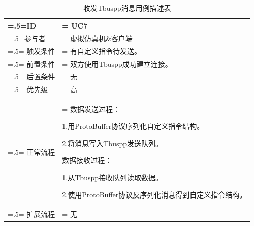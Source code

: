 \begin{table}[htbp]
    \begin{center}
        \caption{收发Tbuspp消息用例描述表}
        \label{usecase7}
        \renewcommand\arraystretch{1.5}
        \begin{tabularx}{0.8\textwidth}{ 
            | >{\centering\arraybackslash\hsize=.5\hsize\linewidth=\hsize}X 
            | >{\raggedright\arraybackslash\hsize=1.5\hsize\linewidth=\hsize}X 
            | }
            \hline
            \textbf{ID} & \textbf{UC7}\\
            \hline
            参与者 & 虚拟仿真机\&客户端\\
            \hline
            触发条件 & 有自定义指令待发送。\\
            \hline
            前置条件 & 双方使用Tbuspp成功建立连接。\\
            \hline
            后置条件 & 无\\
            \hline
            优先级 & 高\\
            \hline
            正常流程 &  数据发送过程：\par 1.用ProtoBuffer协议序列化自定义指令结构。\par 2.将消息写入Tbuspp发送队列。\par 
                       数据接收过程：\par 1.从Tbuspp接收队列读取数据。\par 2.使用ProtoBuffer协议反序列化消息得到自定义指令结构。\\
            \hline
            扩展流程 & 无\\
            \hline
        \end{tabularx}
    \end{center}
\end{table}

